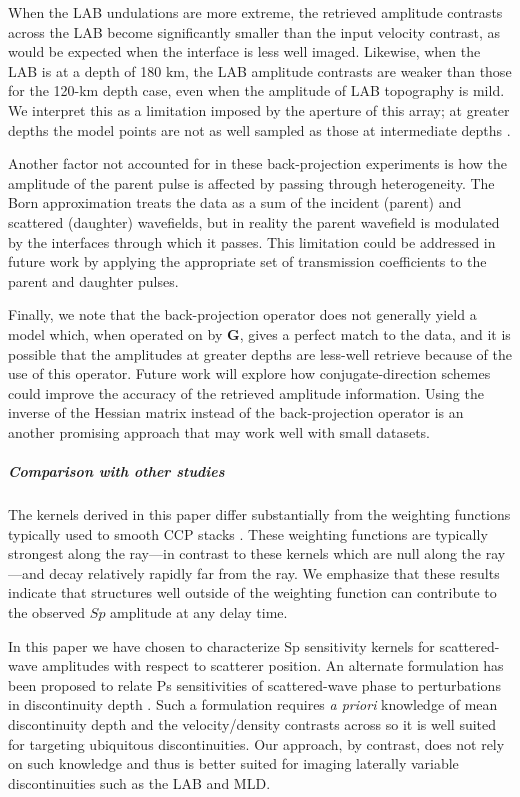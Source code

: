 \documentclass[referee]{gji}
\begin{document}
When the LAB undulations are more extreme, the retrieved amplitude contrasts across the LAB become significantly smaller than the input velocity contrast, as would be expected when the interface is less well imaged.  Likewise, when the LAB is at a depth of 180 km, the LAB amplitude contrasts are weaker than those for the 120-km depth case, even when the amplitude of LAB topography is mild.  We interpret this as a limitation imposed by the aperture of this array; at greater depths the model points are not as well sampled as those at intermediate depths \citep[c.f.,][]{Rondenay2005}.

Another factor not accounted for in these back-projection experiments is how the amplitude of the parent pulse is affected by passing through heterogeneity. The Born approximation treats the data as a sum of the incident (parent) and scattered (daughter) wavefields, but in reality the parent wavefield is modulated by the interfaces through which it passes.  This limitation could be addressed in future work by applying the appropriate set of transmission coefficients to the parent and daughter pulses.

Finally, we note that the back-projection operator does not generally yield a model which, when operated on by $\textbf{G}$, gives a perfect match to the data, and it is possible that the amplitudes at greater depths are less-well retrieve because of the use of this operator.  Future work will explore how conjugate-direction schemes could improve the accuracy of the retrieved amplitude information.  Using the inverse of the Hessian matrix instead of the back-projection operator is an another promising approach that may work well with small datasets.

\subparagraph{Comparison with other studies}
The kernels derived in this paper differ substantially from the weighting functions typically used to smooth CCP stacks \citep[e.g.,][]{Lekic2017}.  These weighting functions are typically strongest along the ray---in contrast to these kernels which are null along the ray---and decay relatively rapidly far from the ray. We emphasize that these results indicate that structures well outside of the weighting function can contribute to the observed $Sp$ amplitude at any delay time.

In this paper we have chosen to characterize Sp sensitivity kernels for scattered-wave amplitudes with respect to scatterer position.  An alternate formulation has been proposed to relate Ps sensitivities of scattered-wave phase to perturbations in discontinuity depth \citep{Deng2015}.  Such a formulation requires \emph{a priori} knowledge of mean discontinuity depth and the velocity/density contrasts across so it is well suited for targeting ubiquitous discontinuities.  Our approach, by contrast, does not rely on such knowledge and thus is better suited for imaging laterally variable discontinuities such as the LAB and MLD.
\end{document}
